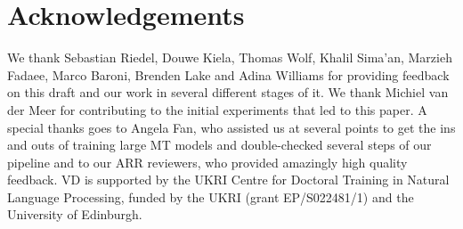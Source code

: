 \section*{Acknowledgements}

We thank Sebastian Riedel, Douwe Kiela, Thomas Wolf, Khalil Sima'an, Marzieh Fadaee, Marco Baroni, Brenden Lake and Adina Williams for providing feedback on this draft and our work in several different stages of it.
We thank Michiel van der Meer for contributing to the initial experiments that led to this paper.
A special thanks goes to Angela Fan, who assisted us at several points to get the ins and outs of training large MT models and double-checked several steps of our pipeline and to our ARR reviewers, who provided amazingly high quality feedback.
VD is supported by the UKRI Centre for Doctoral Training in Natural Language Processing, funded by the UKRI (grant EP/S022481/1) and the University of Edinburgh.
